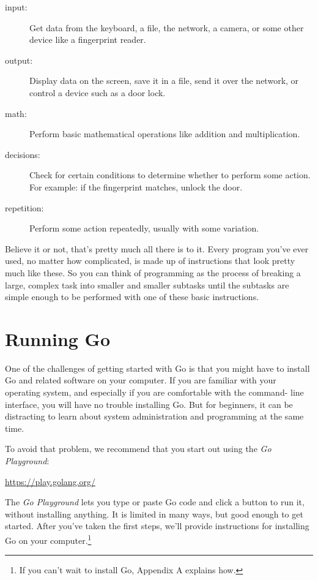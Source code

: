 \begin{description}

\item[input:] Get data from the keyboard, a file, the network,  a camera, or
some other device like a fingerprint reader.

\item[output:] Display data on the screen, save it in a file, send it over the
network, or control a device such as a door lock.

\item[math:] Perform basic mathematical operations like addition and
multiplication.

\item[decisions:] Check for certain conditions to determine whether to perform
some action. For example: if the fingerprint matches, unlock the door.

\item[repetition:] Perform some action repeatedly, usually with some
variation.

\end{description}

Believe it or not, that's pretty much all there is to it. Every program you've
ever used, no matter how complicated, is made up of instructions that look
pretty much like these. So you can think of programming as the process of
breaking a large, complex task into smaller and smaller subtasks until the
subtasks are simple enough to be performed with one of these basic
instructions.


\section{Running Go}

One of the challenges of getting started with Go is that you might have to
install Go and related software on your computer. If you are familiar with
your operating system, and especially if you are comfortable with the command-
line interface, you will have no trouble installing Go. But for beginners, it
can be distracting to learn about system administration and programming at the
same time.

To avoid that problem, we recommend that you start out using the
{\it Go Playground}:

\url{https://play.golang.org/}

The {\it Go Playground} lets you type or paste Go code and click a button
to run it, without installing anything. It is limited in many ways, but good
enough to get started. After you've taken the first steps, we'll provide
instructions for installing Go on your computer.\footnote{If you can't wait to
install Go, Appendix A explains how.}



